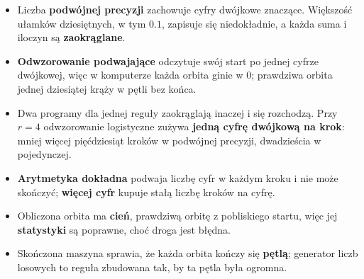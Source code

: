 \begin{summarybox}
\begin{itemize}
\item Liczba \textbf{podwójnej precyzji} zachowuje 
  cyfry dwójkowe znaczące. Większość ułamków dziesiętnych, w tym
  $\num{0.1}$, zapisuje się niedokładnie, a każda suma i iloczyn są
  \textbf{zaokrąglane}.
\item \textbf{Odwzorowanie podwajające} odczytuje swój start po jednej
  cyfrze dwójkowej, więc w komputerze każda orbita ginie w $0$; prawdziwa
  orbita jednej dziesiątej krąży w pętli bez końca.
\item Dwa programy dla jednej reguły zaokrąglają inaczej i się rozchodzą.
  Przy $r = 4$ odwzorowanie logistyczne zużywa \textbf{jedną cyfrę dwójkową
  na krok}: mniej więcej pięćdziesiąt kroków w podwójnej precyzji,
  dwadzieścia w pojedynczej.
\item \textbf{Arytmetyka dokładna} podwaja liczbę cyfr w każdym kroku i nie
  może skończyć; \textbf{więcej cyfr} kupuje stałą liczbę kroków na cyfrę.
\item Obliczona orbita ma \textbf{cień}, prawdziwą orbitę z pobliskiego
  startu, więc jej \textbf{statystyki} są poprawne, choć droga jest błędna.
\item Skończona maszyna sprawia, że każda orbita kończy się \textbf{pętlą};
  generator liczb losowych to reguła zbudowana tak, by ta pętla była
  ogromna.
\end{itemize}
\end{summarybox}

\canyou

